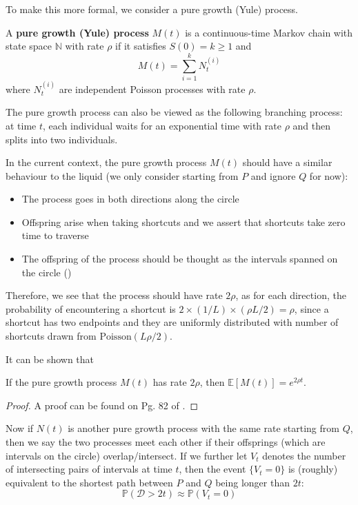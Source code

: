 \documentclass{article}
\begin{document}
To make this more formal, we consider a pure growth (Yule) process.

\begin{definition}
    A \textbf{pure growth (Yule) process} $M(t)$ is a continuous-time Markov chain with state space $\mathbb{N}$ with rate $\rho$ if it satisfies $S(0) = k \geq 1$ and
    \begin{equation*}        
        M(t) = \sum_{i=1}^k N_t^{(i)}
    \end{equation*}
    where $N_t^{(i)}$ are independent Poisson processes with rate $\rho$.
\end{definition}

\begin{remark}
    The pure growth process can also be viewed as the following branching process: at time $t$, each individual waits for an exponential time with rate $\rho$ and then splits into two individuals.
\end{remark}

In the current context, the pure growth process $M(t)$ should have a similar behaviour to the liquid (we only consider starting from $P$ and ignore $Q$ for now):

\begin{itemize}
    \item The process goes in both directions along the circle
    \item Offspring arise when taking shortcuts and we assert that shortcuts take zero time to traverse
    \item The offspring of the process should be thought as the intervals spanned on the circle ()
\end{itemize}

Therefore, we see that the process should have rate $2\rho$, as for each direction, the probability of encountering a shortcut is $2 \times (1/L) \times (\rho L/2) = \rho$, since a shortcut has two endpoints and they are uniformly distributed with number of shortcuts drawn from $\mathrm{Poisson}(L\rho/2)$.  

It can be shown that 
\begin{proposition}
    If the pure growth process $M(t)$ has rate $2\rho$, then $\mathbb{E}[M(t)] = e^{2\rho t}$.
\end{proposition}  
\begin{proof}
    A proof can be found on Pg. 82 of \citep{Norris_1997}.
\end{proof}

Now if $N(t)$ is another pure growth process with the same rate starting from $Q$, then we say the two processes meet each other if their offsprings (which are intervals on the circle) overlap/intersect. If we further let $V_t$ denotes the number of intersecting pairs of intervals at time $t$, then the event $\{V_t=0\}$ is (roughly) equivalent to the shortest path between $P$ and $Q$ being longer than $2t$:
\begin{equation}
    \mathbb{P}(\mathcal{D}>2t) \approx \mathbb{P}(V_t=0)
\end{equation} 
\end{document}
